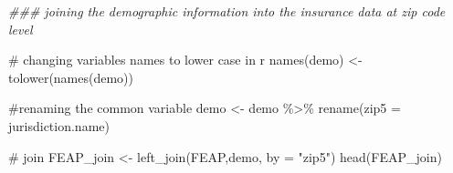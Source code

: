 \documentclass[
  letterpaper,
  DIV=11,
  numbers=noendperiod]{scrartcl}
\newenvironment{Shaded}{\begin{snugshade}}{\end{snugshade}}
\newcommand{\AttributeTok}[1]{\textcolor[rgb]{0.40,0.45,0.13}{#1}}
\newcommand{\CommentTok}[1]{\textcolor[rgb]{0.37,0.37,0.37}{#1}}
\newcommand{\DocumentationTok}[1]{\textcolor[rgb]{0.37,0.37,0.37}{\textit{#1}}}
\newcommand{\FunctionTok}[1]{\textcolor[rgb]{0.28,0.35,0.67}{#1}}
\newcommand{\NormalTok}[1]{\textcolor[rgb]{0.00,0.23,0.31}{#1}}
\newcommand{\OtherTok}[1]{\textcolor[rgb]{0.00,0.23,0.31}{#1}}
\newcommand{\SpecialCharTok}[1]{\textcolor[rgb]{0.37,0.37,0.37}{#1}}
\newcommand{\StringTok}[1]{\textcolor[rgb]{0.13,0.47,0.30}{#1}}
\begin{document}
\begin{Shaded}
\begin{Highlighting}[]
\DocumentationTok{\#\#\# joining the demographic information into the insurance data at zip code level}

\CommentTok{\# changing variables names to lower case in r}
\FunctionTok{names}\NormalTok{(demo) }\OtherTok{\textless{}{-}} \FunctionTok{tolower}\NormalTok{(}\FunctionTok{names}\NormalTok{(demo))}

\CommentTok{\#renaming the common variable }
\NormalTok{demo }\OtherTok{\textless{}{-}}\NormalTok{ demo }\SpecialCharTok{\%\textgreater{}\%}
  \FunctionTok{rename}\NormalTok{(}\AttributeTok{zip5 =}\NormalTok{ jurisdiction.name)}

\CommentTok{\# join}
\NormalTok{FEAP\_join }\OtherTok{\textless{}{-}} \FunctionTok{left\_join}\NormalTok{(FEAP,demo, }\AttributeTok{by =} \StringTok{"zip5"}\NormalTok{)}
\FunctionTok{head}\NormalTok{(FEAP\_join)}
\end{Highlighting}
\end{Shaded}
\end{document}
